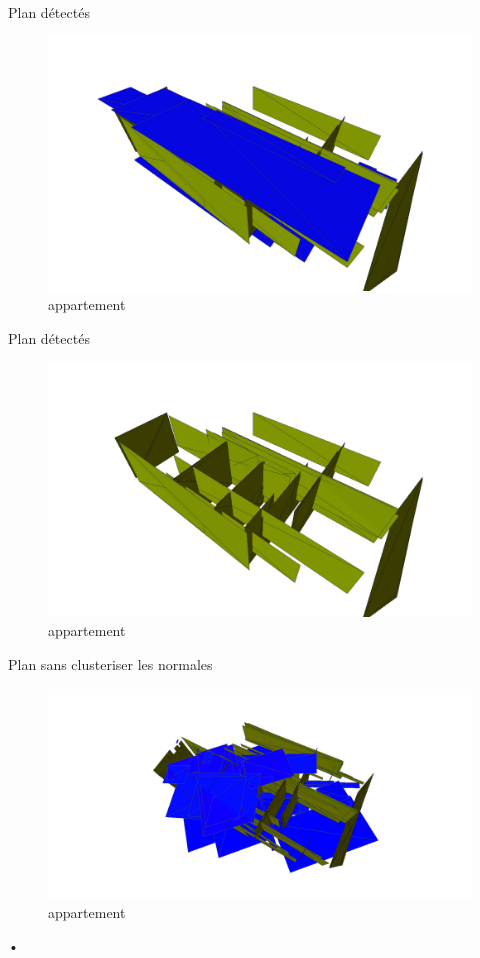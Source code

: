 \documentclass[11pt]{beamer}
\begin{document}
\begin{frame}{Plan détectés}
\begin{figure}[hbtp]
\centering
\includegraphics[width=\columnwidth]{appart06.png}
\caption{appartement}
\end{figure}
\end{frame}
\begin{frame}{Plan détectés}
\begin{figure}[hbtp]
\centering
\includegraphics[width=\columnwidth]{appart05.png}
\caption{appartement}
\end{figure}
\end{frame}

\begin{frame}{Plan sans clusteriser les normales}
\begin{figure}[hbtp]
\centering
\includegraphics[width=\columnwidth]{appart00.png}
\caption{appartement}
\end{figure}
\end{frame}




\begin{frame}{•}
\end{frame}
\end{document}
